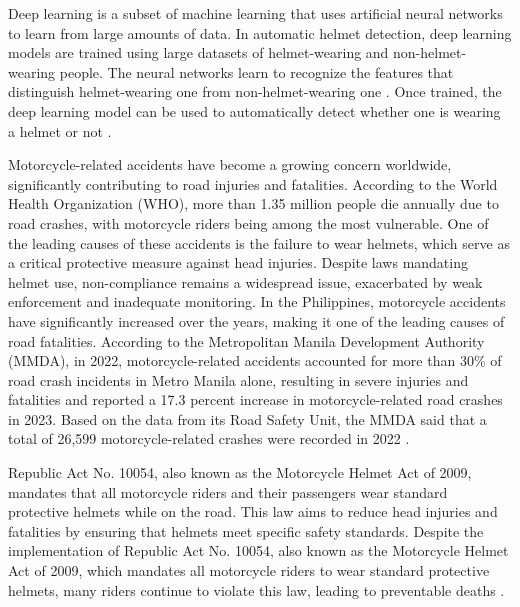\begin{refsection}
Deep learning is a subset of machine learning that uses artificial neural networks to learn from large amounts of data. In automatic helmet detection, deep learning models are trained using large datasets of helmet-wearing and non-helmet-wearing people. The neural networks learn to recognize the features that distinguish helmet-wearing one from non-helmet-wearing one . Once trained, the deep learning model can be used to automatically detect whether one is wearing a helmet or not \cite{Thakur2024}.

Motorcycle-related accidents have become a growing concern worldwide, significantly contributing to road injuries and fatalities. According to the World Health Organization (WHO), more than 1.35 million people die annually due to road crashes, with motorcycle riders being among the most vulnerable. One of the leading causes of these accidents is the failure to wear helmets, which serve as a critical protective measure against head injuries. Despite laws mandating helmet use, non-compliance remains a widespread issue, exacerbated by weak enforcement and inadequate monitoring. In the Philippines, motorcycle accidents have significantly increased over the years, making it one of the leading causes of road fatalities. According to the Metropolitan Manila Development Authority (MMDA), in 2022, motorcycle-related accidents accounted for more than 30\% of road crash incidents in Metro Manila alone, resulting in severe injuries and fatalities and reported a 17.3 percent increase in motorcycle-related road crashes in 2023. Based on the data from its Road Safety Unit, the MMDA said that a total of 26,599 motorcycle-related crashes were recorded in 2022 \cite{MMDA2023}. 

Republic Act No. 10054, also known as the Motorcycle Helmet Act of 2009, mandates that all motorcycle riders and their passengers wear standard protective helmets while on the road. This law aims to reduce head injuries and fatalities by ensuring that helmets meet specific safety standards. Despite the implementation of Republic Act No. 10054, also known as the Motorcycle Helmet Act of 2009, which mandates all motorcycle riders to wear standard protective helmets, many riders continue to violate this law, leading to preventable deaths \cite{Republic2009}. 


\end{refsection}
